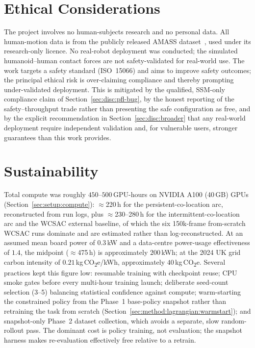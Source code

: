 \documentclass[11pt,a4paper]{report}
\newcommand{\ssm}{SSM}
\newcommand{\iso}{ISO~15066}
\begin{document}
\chapter{Ethical Considerations}
\label{app:ethics}

The project involves no human-subjects research and no personal data.
All human-motion data is from the publicly released AMASS
dataset~\cite{mahmood2019amass}, used under its research-only licence. No
real-robot deployment was conducted; the simulated humanoid--human
contact forces are not safety-validated for real-world use. The work
targets a safety standard (\iso{}) and aims to improve safety outcomes;
the principal ethical risk is over-claiming compliance and thereby
prompting under-validated deployment. This is mitigated by the qualified,
\ssm{}-only compliance claim of Section~\ref{sec:disc:pfl-bug}, by the
honest reporting of the safety--throughput trade rather than presenting
the safe configuration as free, and by the explicit recommendation in
Section~\ref{sec:disc:broader} that any real-world deployment require
independent validation and, for vulnerable users, stronger guarantees
than this work provides.

\chapter{Sustainability}
\label{app:sustainability}

Total compute was roughly $450$--$500$\,GPU-hours on NVIDIA A100
(40\,GB) GPUs (Section~\ref{sec:setup:compute}): $\approx$220\,h for
the persistent-co-location arc, reconstructed from run logs, plus
$\approx$230--280\,h for the intermittent-co-location arc and the
WCSAC external baseline, of which the six 150k-frame from-scratch
WCSAC runs dominate and are estimated rather than log-reconstructed.
At an assumed mean board power of $0.3$\,kW and a data-centre
power-usage effectiveness of $1.4$, the midpoint ($\approx$475\,h) is
approximately $200$\,kWh; at the 2024 UK grid carbon intensity of
$0.21$\,kg\,CO\textsubscript{2}e/kWh, approximately
$40$\,kg\,CO\textsubscript{2}e. Several practices kept this figure low: resumable
training with checkpoint reuse; CPU smoke gates before every multi-hour
training launch; deliberate seed-count selection (3--5) balancing
statistical confidence against compute; warm-starting the constrained
policy from the Phase~1 base-policy snapshot rather than retraining the
task from scratch (Section~\ref{sec:method:lagrangian:warmstart}); and
snapshot-only Phase~2 dataset collection, which avoids a separate, slow
random-rollout pass. The dominant cost is policy training, not
evaluation; the snapshot harness makes re-evaluation effectively free
relative to a retrain.
\end{document}
